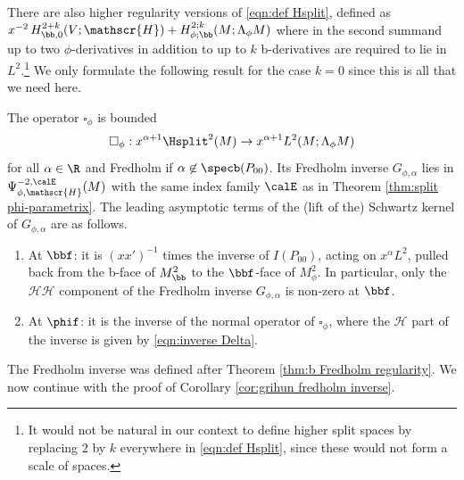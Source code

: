 There are also higher regularity versions of \eqref{eqn:def Hsplit}, defined as $x^{-2}\,H^{2+k}_{\bb,0}(V;\mathscr{H}) + H^{2;k}_{\phi;\bb}(M; \Lambda_\phi M)$ where in the second summand up to two $\phi$-derivatives in addition to up to $k$ b-derivatives are required to lie in $L^2$.\footnote{It would not be natural in our context to define higher split spaces by replacing $2$ by $k$ everywhere in \eqref{eqn:def Hsplit}, since these would not form a scale of spaces.}
We only formulate the following result for the case $k=0$ since this is all that we need here.

\begin{Cor} \label{cor:grihun fredholm inverse}
The operator $\square_\phi$ is bounded\vspace*{-3pt}
\begin{equation}
\label{eqn:box cphi bounded}
\square_{\phi}: x^{\alpha+1} \Hsplit^2(M) \to x^{\alpha+1} L^2 (M; \Lambda_\phi M)
\end{equation}
for all $\alpha\in\R$ and Fredholm if $\alpha\not\in \specb(P_{00})$.
Its Fredholm inverse $G_{\phi,\alpha}$ lies in $\Psi^{-2,\calE}_{\phi, \mathscr{H}}(M)$
with the same index family $\calE$ as in Theorem \ref{thm:split phi-parametrix}.
The leading asymptotic terms of the (lift of the) Schwartz kernel of $G_{\phi,\alpha}$ are as follows.

\begin{enumerate}
\item
At $\bbf$: it is
$(xx')^{-1}$ times the inverse of $I(P_{00})$, acting on $x^\alpha L^2$, pulled back from the
b-face of $M^2_\bb$ to the $\bbf$-face of $M^2_\phi$. In particular, only the
$\mathscr{H}\mathscr{H}$ component of the Fredholm inverse $G_{\phi,\alpha}$ is non-zero at $\bbf$.

\item
At $\phif$: it is the inverse of the normal operator of $\square_{\phi}$, where the $\mathscr{H}$ part of the inverse is given by \eqref{eqn:inverse Delta}.
\end{enumerate}
\end{Cor}

The Fredholm inverse was defined after Theorem \ref{thm:b Fredholm regularity}.
We now continue with the proof of Corollary \ref{cor:grihun fredholm inverse}.

